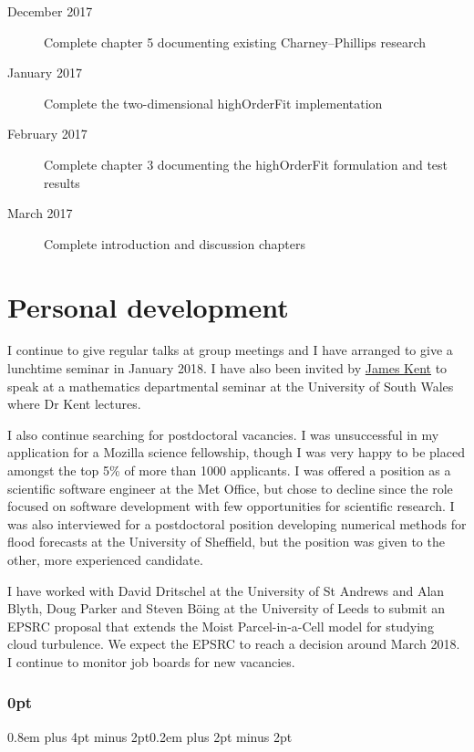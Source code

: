 \documentclass[a4paper,11pt]{article}
\begin{document}
\begin{description}
	\item[December 2017]{Complete chapter 5 documenting existing Charney--Phillips research}
	\item[January 2017]{Complete the two-dimensional highOrderFit implementation}
	\item[February 2017]{Complete chapter 3 documenting the highOrderFit formulation and test results}
	\item[March 2017]{Complete introduction and discussion chapters}
\end{description}

\section{Personal development}

I continue to give regular talks at group meetings and I have arranged to give a lunchtime seminar in January 2018.
I have also been invited by \href{http://staff.southwales.ac.uk/users/8005-jkent}{James Kent} to speak at a mathematics departmental seminar at the University of South Wales where Dr Kent lectures.

I also continue searching for postdoctoral vacancies.
I was unsuccessful in my application for a Mozilla science fellowship, though I was very happy to be placed amongst the top 5\% of more than 1000 applicants.
I was offered a position as a scientific software engineer at the Met Office, but chose to decline since the role focused on software development with few opportunities for scientific research.
I was also interviewed for a postdoctoral position developing numerical methods for flood forecasts at the University of Sheffield, but the position was given to the other, more experienced candidate.

I have worked with David Dritschel at the University of St Andrews and Alan Blyth, Doug Parker and Steven B\"{o}ing at the University of Leeds to submit an EPSRC proposal that extends the Moist Parcel-in-a-Cell model \citep{boeing2017} for studying cloud turbulence.  We expect the EPSRC to reach a decision around March 2018.
I continue to monitor job boards for new vacancies.

                                                 


\newpage

\titlespacing\subsubsection{0pt}{0.8em plus 4pt minus 2pt}{0.2em plus 2pt minus 2pt}
\end{document}
